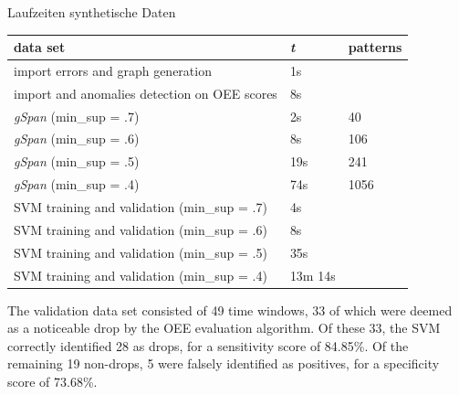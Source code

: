 \documentclass{beamer}
\begin{document}
\begin{frame}{Laufzeiten synthetische Daten}
\begin{table}[]
    \centering
    \label{table:runtimes_syn}
    \begin{tabular}{l|l|l}
        data set                                      & \textit{t} & patterns \\ \hline
        import errors and graph generation            & 1s         &          \\
        import and anomalies detection on OEE scores  & 8s         &          \\ \hline
        \textit{gSpan} (min\_sup = .7)                & 2s         & 40       \\
        \textit{gSpan} (min\_sup = .6)                & 8s         & 106      \\
        \textit{gSpan} (min\_sup = .5)                & 19s        & 241      \\
        \textit{gSpan} (min\_sup = .4)                & 74s        & 1056     \\ \hline
        SVM training and validation   (min\_sup = .7) & 4s         &          \\
        SVM training and validation   (min\_sup = .6) & 8s         &          \\
        SVM training and validation   (min\_sup = .5) & 35s        &          \\
        SVM training and validation   (min\_sup = .4) & 13m 14s    &
    \end{tabular}
\end{table}
The validation data set consisted of 49 time windows, 33 of which were deemed as a noticeable drop by the OEE evaluation algorithm. Of these 33, the SVM correctly identified 28 as drops, for a sensitivity score of 84.85\%. Of the remaining 19 non-drops, 5 were falsely identified as positives, for a specificity score of 73.68\%.
\end{frame}
\end{document}
